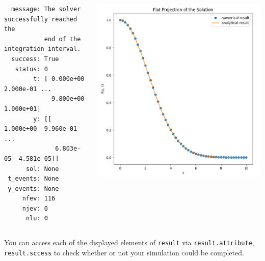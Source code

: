 %
\begin{frame}[fragile]
%
\begin{columns}
\begin{cmdbox}[Output: First Order ODE:  $y' {=} \alpha \cdot t \cdot y$]
\begin{verbatim}
  message: The solver successfully reached the 
           end of the integration interval.
  success: True
   status: 0
        t: [ 0.000e+00  2.000e-01 ...  
             9.800e+00  1.000e+01]
        y: [[ 1.000e+00  9.960e-01 ...  
              6.803e-05  4.581e-05]]
      sol: None
 t_events: None
 y_events: None
     nfev: 116
     njev: 0
      nlu: 0
\end{verbatim}
\end{cmdbox}
%
\includegraphics[width=\linewidth]{./gfx/07-ODE-solution}
\end{columns}
%
\vspace{-3pt}
\begin{hintbox}
\footnotesize
You can access each of the displayed elements of \texttt{result} via \texttt{result.attribute}, \zB \texttt{result.sccess} to check whether or not your simulation could be completed.
\end{hintbox}
%
\end{frame}

